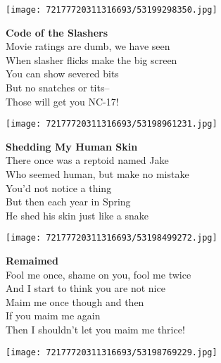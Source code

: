 \documentclass[10pt,letterpaper]{article}
\begin{document}
\begin{center}
\texttt{[image: 72177720311316693/53199298350.jpg]}
\end{center}

\begin{center}
\textbf{Code of the Slashers}\\
\vskip 0.2in
Movie ratings are dumb, we have seen\\
When slasher flicks make the big screen\\
You can show severed bits\\
But no snatches or tits--\\
Those will get you NC-17!\\
\end{center}
\pagebreak

\begin{center}\texttt{[image: 72177720311316693/53198961231.jpg]}
\end{center}
\begin{center}
\textbf{Shedding My Human Skin}\\
\vskip 0.2in
There once was a reptoid named Jake\\
Who seemed human, but make no mistake\\
You'd not notice a thing\\
But then each year in Spring\\
He shed his skin just like a snake\\
\end{center}
\pagebreak

\begin{center}
\texttt{[image: 72177720311316693/53198499272.jpg]}
\end{center}

\begin{center}
\textbf{Remaimed}\\
\vskip 0.2in
Fool me once, shame on you, fool me twice\\
And I start to think you are not nice\\
Maim me once though and then\\
If you maim me again\\
Then I shouldn't let you maim me thrice!\\
\end{center}
\pagebreak

\begin{center}
\texttt{[image: 72177720311316693/53198769229.jpg]}
\end{center}
\end{document}
